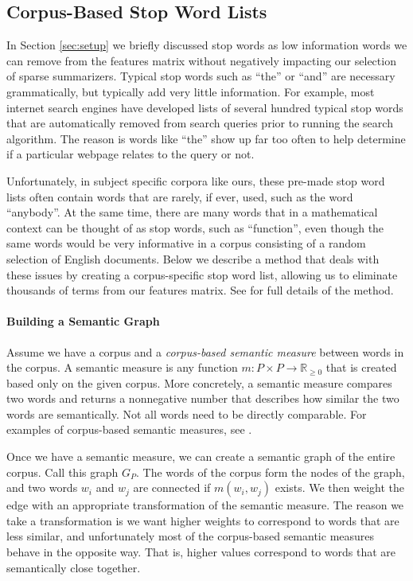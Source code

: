 \documentclass{article}
\begin{document}
\subsection{Corpus-Based Stop Word Lists}

In Section \ref{sec:setup} we briefly discussed stop words as low information words we can remove from the features matrix without negatively impacting our selection of sparse summarizers.  Typical stop words such as ``the'' or ``and'' are necessary grammatically, but typically add very little information.  For example, most internet search engines have developed lists of several hundred typical stop words that are automatically removed from search queries prior to running the search algorithm.  The reason is words like ``the'' show up far too often to help determine if a particular webpage relates to the query or not.

Unfortunately, in subject specific corpora like ours, these pre-made stop word lists often contain words that are rarely, if ever, used, such as the word ``anybody''.  At the same time, there are many words that in a mathematical context can be thought of as stop words, such as ``function'', even though the same words would be very informative in a corpus consisting of a random selection of English documents.  Below we describe a method that deals with these issues by creating a corpus-specific stop word list, allowing us to eliminate thousands of terms from our features matrix.  See \cite{junod} for full details of the method.

\paragraph{Building a Semantic Graph}  Assume we have a corpus and a \emph{corpus-based semantic measure} between words in the corpus.  A semantic measure is any function $m: P \times P \to \mathbb{R}_{\geq 0}$ that is created based only on the given corpus.  More concretely, a semantic measure compares two words and returns a nonnegative number that describes how similar the two words are semantically.  Not all words need to be directly comparable.  For examples of corpus-based semantic measures, see \cite{islamSOCPMI, landauer, turney}.

Once we have a semantic measure, we can create a semantic graph of the entire corpus.  Call this graph $G_P$.  The words of the corpus form the nodes of the graph, and two words $w_i$ and $w_j$ are connected if $m(w_i,w_j)$ exists.  We then weight the edge with an appropriate transformation of the semantic measure.  The reason we take a transformation is we want higher weights to correspond to words that are less similar, and unfortunately most of the corpus-based semantic measures behave in the opposite way.  That is, higher values correspond to words that are semantically close together.
\end{document}
